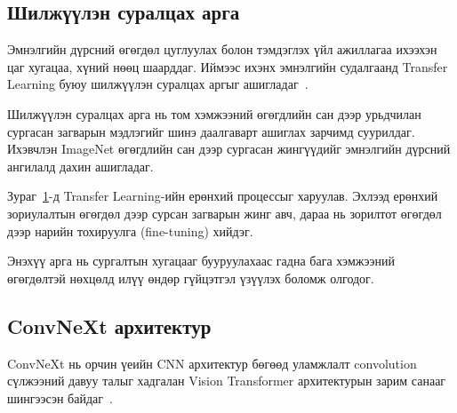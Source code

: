 \subsection*{Шилжүүлэн суралцах арга}

\begin{figure}[H]
    \centering
    \label{fig:transfer_learning}
\end{figure}

Эмнэлгийн дүрсний өгөгдөл цуглуулах болон тэмдэглэх үйл ажиллагаа ихээхэн цаг хугацаа, хүний нөөц шаарддаг. Иймээс ихэнх эмнэлгийн судалгаанд Transfer Learning буюу шилжүүлэн суралцах аргыг ашигладаг~\cite{ref30}.

Шилжүүлэн суралцах арга нь том хэмжээний өгөгдлийн сан дээр урьдчилан сургасан загварын мэдлэгийг шинэ даалгаварт ашиглах зарчимд суурилдаг. Ихэвчлэн ImageNet өгөгдлийн сан дээр сургасан жингүүдийг эмнэлгийн дүрсний ангилалд дахин ашигладаг.

Зураг~\ref{fig:transfer_learning}-д Transfer Learning-ийн ерөнхий процессыг харуулав. Эхлээд ерөнхий зориулалтын өгөгдөл дээр сурсан загварын жинг авч, дараа нь зорилтот өгөгдөл дээр нарийн тохируулга (fine-tuning) хийдэг.

Энэхүү арга нь сургалтын хугацааг бууруулахаас гадна бага хэмжээний өгөгдөлтэй нөхцөлд илүү өндөр гүйцэтгэл үзүүлэх боломж олгодог.

\subsection*{ConvNeXt архитектур}

\begin{figure}[H]
    \centering
    \label{fig:convnext_block}
\end{figure}

ConvNeXt нь орчин үеийн CNN архитектур бөгөөд уламжлалт convolution сүлжээний давуу талыг хадгалан Vision Transformer архитектурын зарим санааг шингээсэн байдаг~\cite{liu2022convnext}.

